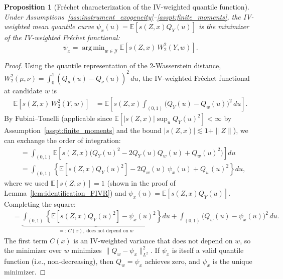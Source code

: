 \documentclass[12pt]{article}
\newcommand{\E}{\mathbb{E}}
\DeclareMathOperator*{\argmin}{arg\,min}
\newcommand{\calP}{\mathcal{Y}} %
\newtheorem{proposition}{Proposition}
\begin{document}
\begin{proposition}[Fr\'echet characterization of the IV-weighted quantile function]\label{prop:frechet_equiv}
Under Assumptions~\ref{ass:instrument_exogeneity}--\ref{asspt:finite_moments}, the IV-weighted mean quantile curve $\psi_x(u) = \E[s(Z,x) Q_Y(u)]$ is the minimizer of the IV-weighted Fr\'echet functional:
\[
\psi_x = \argmin_{w \in \calP} \E\!\left[s(Z,x)\, W_2^2(Y, w)\right].
\]
\end{proposition}

\begin{proof}
Using the quantile representation of the 2-Wasserstein distance, $W_2^2(\mu,\nu) = \int_0^1 (Q_\mu(u) - Q_\nu(u))^2\, du$, the IV-weighted Fr\'echet functional at candidate $w$ is
\begin{align*}
\E\!\left[s(Z,x)\, W_2^2(Y, w)\right]
&= \E\!\left[s(Z,x) \int_{(0,1)} \big(Q_Y(u) - Q_w(u)\big)^2\, du\right].
\end{align*}
By Fubini--Tonelli (applicable since $\E[|s(Z,x)| \sup_u Q_Y(u)^2] < \infty$ by Assumption~\ref{asspt:finite_moments} and the bound $|s(Z,x)| \lesssim 1 + \|Z\|$), we can exchange the order of integration:
\begin{align*}
&= \int_{(0,1)} \E\!\left[s(Z,x)\big(Q_Y(u)^2 - 2 Q_Y(u) Q_w(u) + Q_w(u)^2\big)\right] du \\
&= \int_{(0,1)} \left\{\E[s(Z,x) Q_Y(u)^2] - 2 Q_w(u)\, \psi_x(u) + Q_w(u)^2\right\} du,
\end{align*}
where we used $\E[s(Z,x)] = 1$ (shown in the proof of Lemma~\ref{lem:identification_FIVR}) and $\psi_x(u) = \E[s(Z,x) Q_Y(u)]$. Completing the square:
\begin{align*}
&= \underbrace{\int_{(0,1)} \left\{\E[s(Z,x) Q_Y(u)^2] - \psi_x(u)^2\right\} du}_{=:\, C(x),\;\text{does not depend on }w} + \int_{(0,1)} \big(Q_w(u) - \psi_x(u)\big)^2\, du.
\end{align*}
The first term $C(x)$ is an IV-weighted variance that does not depend on $w$, so the minimizer over $w$ minimizes $\|Q_w - \psi_x\|_{L^2}^2$. If $\psi_x$ is itself a valid quantile function (i.e., non-decreasing), then $Q_w = \psi_x$ achieves zero, and $\psi_x$ is the unique minimizer.
\end{proof}
\end{document}
